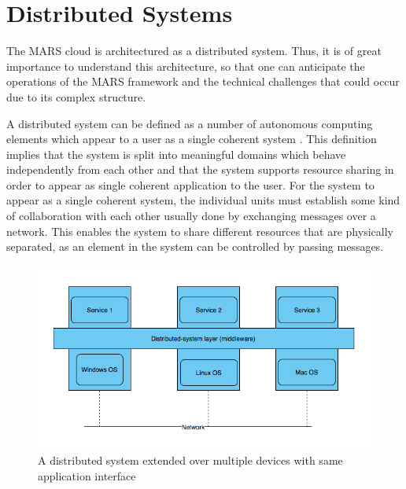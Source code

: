 \section{Distributed Systems}

    The MARS cloud is architectured as a distributed system. Thus, it is of great importance to understand
    this architecture, so that one can anticipate the operations of the MARS framework and
    the technical challenges that could occur due to its complex structure.
    \par
    A distributed system can be defined as a number of autonomous computing elements which 
    appear to a user as a single coherent system \cite[p.~2]{DistributedSystems}. This definition implies that the system is split into meaningful domains which behave 
    independently from each other and that the system supports resource sharing in order to appear as single coherent application to the user. 
    For the system to appear as a single coherent system, the individual units must establish some kind of collaboration
    with each other usually done by exchanging messages over a network. This enables the system to share different resources that are physically separated, 
    as an element in the system can be controlled by passing messages.


    

    \begin{figure}[H]
        \centering \includegraphics[scale=0.5]{grafiken/distributedSystem.png}
        \caption{A distributed system extended over multiple devices with same application 
        interface \cite[p.~5]{DistributedSystems}}
        \label{fig:distributedSystem}
    \end{figure}

